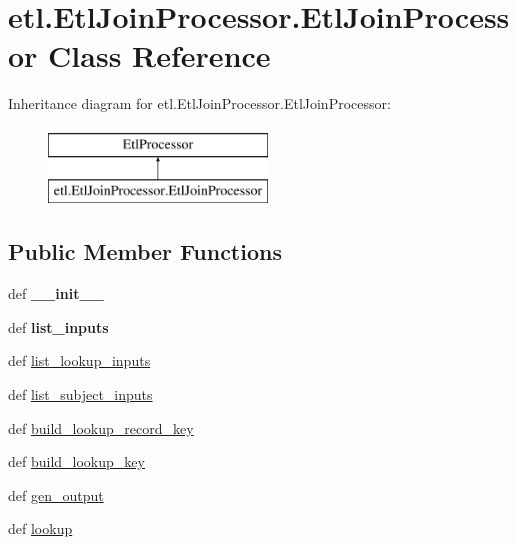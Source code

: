 \hypertarget{classetl_1_1EtlJoinProcessor_1_1EtlJoinProcessor}{\section{etl.\-Etl\-Join\-Processor.\-Etl\-Join\-Processor Class Reference}
\label{classetl_1_1EtlJoinProcessor_1_1EtlJoinProcessor}
}
Inheritance diagram for etl.\-Etl\-Join\-Processor.\-Etl\-Join\-Processor\-:\begin{figure}[H]
\begin{center}
\leavevmode
\includegraphics[height=2.000000cm]{classetl_1_1EtlJoinProcessor_1_1EtlJoinProcessor}
\end{center}
\end{figure}
\subsection*{Public Member Functions}
\begin{DoxyCompactItemize}
\item 
\hypertarget{classetl_1_1EtlJoinProcessor_1_1EtlJoinProcessor_a88ffde25fdd2cc96ee2f1528cd019f4d}{def {\bfseries \-\_\-\-\_\-init\-\_\-\-\_\-}}\label{classetl_1_1EtlJoinProcessor_1_1EtlJoinProcessor_a88ffde25fdd2cc96ee2f1528cd019f4d}

\item 
\hypertarget{classetl_1_1EtlJoinProcessor_1_1EtlJoinProcessor_a3b4bfc44895abfb740ae6c3ea93b2306}{def {\bfseries list\-\_\-inputs}}\label{classetl_1_1EtlJoinProcessor_1_1EtlJoinProcessor_a3b4bfc44895abfb740ae6c3ea93b2306}

\item 
def \hyperlink{classetl_1_1EtlJoinProcessor_1_1EtlJoinProcessor_ab19040ec6313ce7cf54e1f2dc9d834de}{list\-\_\-lookup\-\_\-inputs}
\item 
def \hyperlink{classetl_1_1EtlJoinProcessor_1_1EtlJoinProcessor_a3dc84a5aa91be7bc9323edbea0a5e121}{list\-\_\-subject\-\_\-inputs}
\item 
def \hyperlink{classetl_1_1EtlJoinProcessor_1_1EtlJoinProcessor_a06eafbd5af31068c07ed050327396708}{build\-\_\-lookup\-\_\-record\-\_\-key}
\item 
def \hyperlink{classetl_1_1EtlJoinProcessor_1_1EtlJoinProcessor_a39409cd0d1a82d79ad238832500bf543}{build\-\_\-lookup\-\_\-key}
\item 
def \hyperlink{classetl_1_1EtlJoinProcessor_1_1EtlJoinProcessor_aed55617ed6415c98f3cb12b5af04bf74}{gen\-\_\-output}
\item 
def \hyperlink{classetl_1_1EtlJoinProcessor_1_1EtlJoinProcessor_a61b0670d226d114b033548b87d4d3f11}{lookup}
\end{DoxyCompactItemize}


